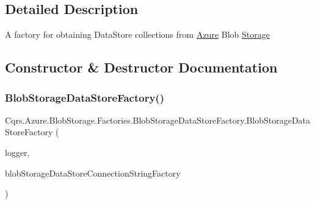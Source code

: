\subsection{Detailed Description}
A factory for obtaining Data\+Store collections from \hyperlink{namespaceCqrs_1_1Azure}{Azure} Blob \hyperlink{namespaceCqrs_1_1Azure_1_1Storage}{Storage} 



\subsection{Constructor \& Destructor Documentation}
\mbox{\label{classCqrs_1_1Azure_1_1BlobStorage_1_1Factories_1_1BlobStorageDataStoreFactory_a448e77623db63d7a66fc6b6c75466eac}} 
\subsubsection{\texorpdfstring{Blob\+Storage\+Data\+Store\+Factory()}{BlobStorageDataStoreFactory()}}
{\footnotesize\ttfamily Cqrs.\+Azure.\+Blob\+Storage.\+Factories.\+Blob\+Storage\+Data\+Store\+Factory.\+Blob\+Storage\+Data\+Store\+Factory (\begin{DoxyParamCaption}\item[{I\+Logger}]{logger,  }\item[{\hyperlink{interfaceCqrs_1_1Azure_1_1BlobStorage_1_1DataStores_1_1IBlobStorageDataStoreConnectionStringFactory}{I\+Blob\+Storage\+Data\+Store\+Connection\+String\+Factory}}]{blob\+Storage\+Data\+Store\+Connection\+String\+Factory }\end{DoxyParamCaption})\hspace{0.3cm}{\ttfamily [protected]}}



